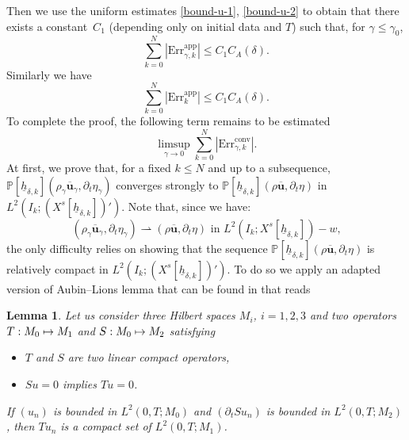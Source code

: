 \documentclass[11pt]{article}
\newcommand\mto{\mathchoice{\longmapsto}{\mapsto}{\mapsto}{\mapsto}}
\newcommand{\app}{\mathrm{app}}
\newcommand{\conv}{\mathrm{conv}}
\newcommand{\Err}{\mathrm{Err}}
\newtheorem{lemma}[theorem]{Lemma}
\theoremstyle{remark}
\theoremstyle{definition}
\newcommand{\ug}{\boldsymbol{u}}
\newcommand{\hb}{{\underline{h}}}
\begin{document}
Then we use the uniform estimates \eqref{bound-u-1}, \eqref{bound-u-2} to obtain that there exists a constant~$C_1$
(depending only on initial data and $T$) such that, for $\gamma \leq \gamma_0$,
\begin{equation} \label{eq_Err1}
\sum_{k=0}^N |\Err_{\gamma,k}^{\app}| \leq C_1 C_A(\delta).
\end{equation}
Similarly we have
\begin{equation} \label{eq_Err2}
\sum_{k=0}^N |\Err_{k}^{\app}| \leq C_1 C_A(\delta).
\end{equation}
To complete the proof, the following term remains to be estimated
\[
\limsup_{\gamma \to 0} \sum_{k=0}^N |\Err_{\gamma,k}^{\conv}|.
\]
At first, we prove that, for a fixed $k \leq N$ and up to a subsequence, $\mathbb{P}[\hb_{\delta, k}](\rho_{\gamma}\overline{\ug}_{\gamma},\partial_{t}\eta_{\gamma})$ converges strongly to $\mathbb{P}[\hb_{\delta, k}](\rho\overline{\ug},\partial_{t}\eta)$ in $L^{2}(I_{k};(X^{s}[\hb_{\delta, k}])')$. Note that, since we have:
\[
(\rho_{\gamma}\overline{\ug}_{\gamma},\partial_t \eta_{\gamma}) \rightharpoonup (\rho \overline{\ug},\partial_t \eta) \text{ in $L^2(I_k;X^s[\hb_{\delta, k}])-w$,}
\]
the only difficulty relies on showing that the sequence $\mathbb{P}[\hb_{\delta, k}](\rho\overline{\ug},\partial_{t}\eta)$ is relatively compact in $L^{2}(I_{k};(X^{s}[\hb_{\delta, k}])')$.
To do so we apply an adapted version of Aubin--Lions lemma that can be found in \cite[\S 4.3]{Fujita-Sauer} that reads
\begin{lemma} Let us consider three Hilbert spaces $M_i$, $i=1, 2,3 $ and two operators $T : M_0 \mto M_1$ and $S : M_0 \mto M_2$ satisfying
\begin{itemize}
\item $T$ and $S$ are two linear compact operators,
\item $Su=0$ implies $Tu=0$.
\end{itemize}
If $(u_n)$ is bounded in $L^2(0, T; M_0)$ and $(\partial_t S u_n)$ is bounded in $L^2(0, T; M_2)$, then $T u_n$ is a compact set of $L^2(0, T; M_1)$.
\end{lemma}
\end{document}
